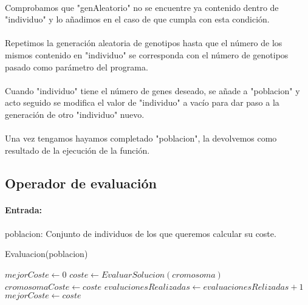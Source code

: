 	\paragraph{}Comprobamos que "genAleatorio" no se encuentre ya contenido dentro de "individuo" y lo añadimos en el caso de que cumpla con esta condición.
	
	\paragraph{}Repetimos la generación aleatoria de genotipos hasta que el número de los mismos contenido en "individuo" se corresponda con el número de genotipos pasado como parámetro del programa.
	
	\paragraph{}Cuando "individuo" tiene el número de genes deseado, se añade a "poblacion" y acto seguido se modifica el valor de "individuo" a vacío para dar paso a la generación de otro "individuo" nuevo.
	
	\paragraph{}Una vez tengamos hayamos completado "poblacion", la devolvemos como resultado de la ejecución de la función.

	\subsection{Operador de evaluación}
	
	\paragraph{Entrada:}
	
	\paragraph{}poblacion: Conjunto de individuos de los que queremos calcular su coste.

	\begin{algorithm}[H]
		\caption{Evaluacion(poblacion)}
		\begin{algorithmic}
			\STATE $mejorCoste \leftarrow 0$
					\STATE $ coste \leftarrow EvaluarSolucion(cromosoma)$
					\STATE $ cromosomaCoste \leftarrow coste$
					\STATE $ evalucionesRealizadas \leftarrow evaluacionesRelizadas + 1$
						\STATE $ mejorCoste \leftarrow coste $
					\ENDIF 
				\ENDIF
			\ENDFOR
		\end{algorithmic}
	\end{algorithm}

